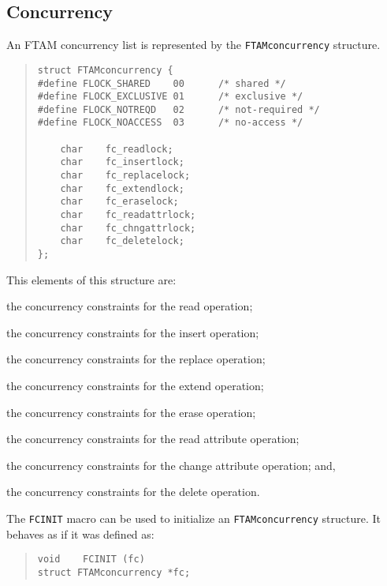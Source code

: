 \subsection	{Concurrency}
An FTAM concurrency list is represented by the \verb"FTAMconcurrency"
structure.
\begin{quote}\small\begin{verbatim}
struct FTAMconcurrency {
#define FLOCK_SHARED    00      /* shared */
#define FLOCK_EXCLUSIVE 01      /* exclusive */
#define FLOCK_NOTREQD   02      /* not-required */
#define FLOCK_NOACCESS  03      /* no-access */

    char    fc_readlock;
    char    fc_insertlock;
    char    fc_replacelock;
    char    fc_extendlock;
    char    fc_eraselock;
    char    fc_readattrlock;
    char    fc_chngattrlock;
    char    fc_deletelock;
};
\end{verbatim}\end{quote}
This elements of this structure are:
\begin{describe}
\item[\verb"fc\_readlock":] the concurrency constraints for the read operation;

\item[\verb"fc\_insertlock":] the concurrency constraints for the insert
operation; 

\item[\verb"fc\_replacelock":] the concurrency constraints for the replace
operation;

\item[\verb"fc\_extendlock":] the concurrency constraints for the extend
operation; 

\item[\verb"fc\_eraselock":] the concurrency constraints for the erase
operation; 

\item[\verb"fc\_readattrlock":] the concurrency constraints for the read
attribute operation;

\item[\verb"fc\_chngattrlock":] the concurrency constraints for the change
attribute operation;
and,

\item[\verb"fc\_deletelock":] the concurrency constraints for the delete
operation.
\end{describe}
The \verb"FCINIT" macro can be used to initialize an
\verb"FTAMconcurrency" structure.
It behaves as if it was defined as:
\begin{quote}\small\begin{verbatim}
void    FCINIT (fc)
struct FTAMconcurrency *fc;
\end{verbatim}\end{quote}

